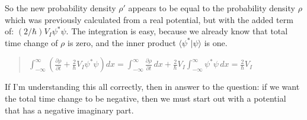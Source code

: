 \documentclass{article}
\begin{document}
So the new probability density $\rho'$ appears to be equal to the
probability density $\rho$ which was previously calculated from a real
potential, but with the added term of:
$(2/\hbar)V_I\psi^*\psi$. The integration is easy, because we already
know that total time change of $\rho$ is zero, and the inner product
$\langle \psi^*|\psi\rangle$ is one.
\begin{quote}
$
   \int_{-\infty}^{\infty}
    \left(
        \frac{\partial\rho}{\partial t} + \frac{2}{\hbar}V_I\psi^*\psi
    \right)dx
   = \int_{-\infty}^{\infty} \frac{\partial\rho}{\partial t}\,dx
   + \frac{2}{\hbar}V_I\int_{-\infty}^{\infty} \psi^*\psi\,dx
    = \frac{2}{\hbar}V_I
$
\end{quote}
If I'm understanding this all correctly, then in answer to the question:
if we want the total time change to be negative, then we must start out
with a potential that has a negative imaginary part.
\end{document}
